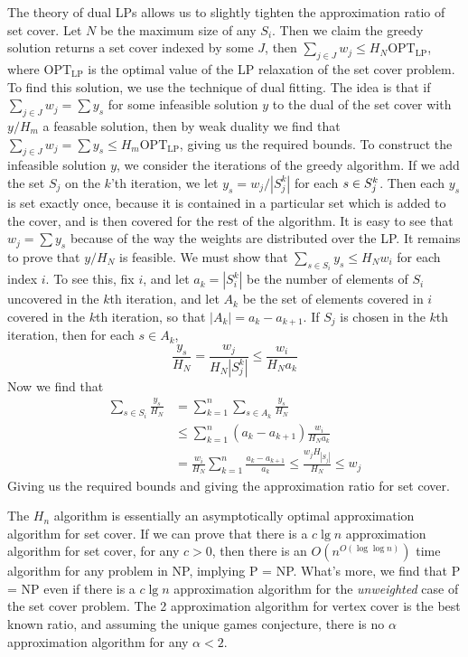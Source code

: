 The theory of dual LPs allows us to slightly tighten the approximation ratio of set cover. Let $N$ be the maximum size of any $S_i$. Then we claim the greedy solution returns a set cover indexed by some $J$, then $\sum_{j \in J} w_j \leq H_N \text{OPT}_{\text{LP}}$, where $\text{OPT}_{\text{LP}}$ is the optimal value of the LP relaxation of the set cover problem. To find this solution, we use the technique of dual fitting. The idea is that if $\sum_{j \in J} w_j = \sum y_s$ for some infeasible solution $y$ to the dual of the set cover with $y/H_m$ a feasable solution, then by weak duality we find that $\sum_{j \in J} w_j = \sum y_s \leq H_m \text{OPT}_{\text{LP}}$, giving us the required bounds. To construct the infeasible solution $y$, we consider the iterations of the greedy algorithm. If we add the set $S_j$ on the $k$'th iteration, we let $y_s = w_j/|S_j^k|$ for each $s \in \smash{S_j^k}$. Then each $y_s$ is set exactly once, because it is contained in a particular set which is added to the cover, and is then covered for the rest of the algorithm. It is easy to see that $w_j = \sum y_s$ because of the way the weights are distributed over the LP. It remains to prove that $y/H_N$ is feasible. We must show that $\sum_{s \in S_i} y_s \leq H_N w_i$ for each index $i$. To see this, fix $i$, and let $a_k = |S_i^k|$ be the number of elements of $S_i$ uncovered in the $k$th iteration, and let $A_k$ be the set of elements covered in $i$ covered in the $k$th iteration, so that $|A_k| = a_k - a_{k+1}$. If $S_j$ is chosen in the $k$th iteration, then for each $s \in A_k$,
%
\[ \frac{y_s}{H_N} = \frac{w_j}{H_N |S_j^k|} \leq \frac{w_i}{H_N a_k} \]
%
Now we find that
%
\begin{align*}
    \sum_{s \in S_i} \frac{y_s}{H_N} &= \sum_{k = 1}^n \sum_{s \in A_k} \frac{y_s}{H_N}\\
    &\leq \sum_{k = 1}^n (a_k - a_{k+1}) \frac{w_i}{H_N a_k}\\
    &= \frac{w_i}{H_N} \sum_{k = 1}^n \frac{a_k - a_{k+1}}{a_k} \leq \frac{w_j H_{|S_j|}}{H_N} \leq w_j
\end{align*}
%
Giving us the required bounds and giving the approximation ratio for set cover.

The $H_n$ algorithm is essentially an asymptotically optimal approximation algorithm for set cover. If we can prove that there is a $c \lg n$ approximation algorithm for set cover, for any $c > 0$, then there is an $O(n^{O(\log \log n)})$ time algorithm for any problem in NP, implying P = NP. What's more, we find that P = NP even if there is a $c \lg n$ approximation algorithm for the {\it unweighted} case of the set cover problem. The 2 approximation algorithm for vertex cover is the best known ratio, and assuming the unique games conjecture, there is no $\alpha$ approximation algorithm for any $\alpha < 2$.

